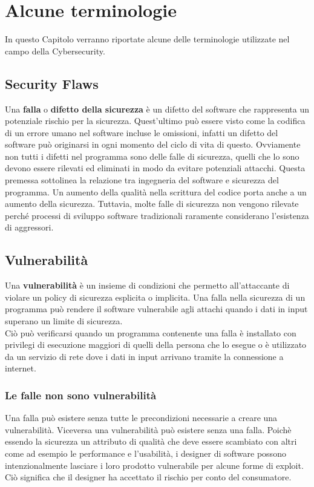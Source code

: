 \chapter{Alcune terminologie}\label{ch:terminologie}
In questo Capitolo verranno riportate alcune delle terminologie utilizzate nel campo della Cybersecurity.

\section{Security Flaws}
Una \textbf{falla} o \textbf{difetto della sicurezza} è un difetto del software che rappresenta un potenziale rischio per la sicurezza. Quest'ultimo può essere visto come la codifica di un errore umano nel software incluse le omissioni, infatti un difetto del software può originarsi in ogni momento del ciclo di vita di questo. Ovviamente non tutti i difetti nel programma sono delle falle di sicurezza, quelli che lo sono devono essere rilevati ed eliminati in modo da evitare potenziali attacchi. Questa premessa sottolinea la relazione tra ingegneria del software e sicurezza del programma. Un aumento della qualità nella scrittura del codice porta anche a un aumento della sicurezza. Tuttavia, molte falle di sicurezza non vengono rilevate perché processi di sviluppo software tradizionali raramente considerano l'esistenza di aggressori.

\section{Vulnerabilità}
Una \textbf{vulnerabilità} è un insieme di condizioni che permetto all'attaccante di violare un policy di sicurezza esplicita o implicita. Una falla nella sicurezza di un programma può rendere il software vulnerabile agli attachi quando i dati in input superano un limite di sicurezza.\\
Ciò può verificarsi quando un programma contenente una falla è installato con privilegi di esecuzione maggiori di quelli della persona che lo esegue o è utilizzato da un servizio di rete dove i dati in input arrivano tramite la connessione a internet.

\subsection{Le falle non sono vulnerabilità}
Una falla può esistere senza tutte le precondizioni necessarie a creare una vulnerabilità. Viceversa una vulnerabilità può esistere senza una falla. Poichè essendo la sicurezza un attributo di qualità che deve essere scambiato con altri come ad esempio le performance e l'usabilità, i designer di software possono intenzionalmente lasciare i loro prodotto vulnerabile per alcune forme di exploit. Ciò significa che il designer ha accettato il rischio per conto del consumatore.

